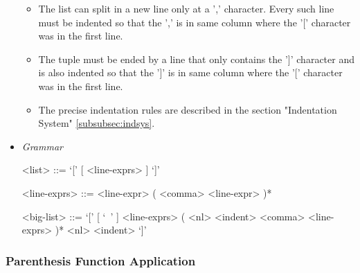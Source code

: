 \documentclass{article}
\begin{document}
\begin{itemize}
\begin{itemize}
  \item
  The list can split in a new line only at a ',' character. Every such line must
  be indented so that the ',' is in same column where the '[' character was in
  the first line.

  \item
  The tuple must be ended by a line that only contains the ']' character and is 
  also indented so that the ']' is in same column where the '[' character was in
  the first line.

  \item
  The precise indentation rules are described in the section
  "Indentation System" \ref{subsubsec:indsys}.
  \end{itemize}

\item \textit{Grammar}
\begin{grammar}
<list> ::= `[' [ <line-exprs> ] `]'

<line-exprs> ::= <line-expr> ( <comma> <line-expr> )*

<big-list> ::= 
`[' [ `\ ' ] <line-exprs> ( <nl> <indent> <comma> <line-exprs> )* <nl> <indent> `]'
\end{grammar}

\end{itemize}

\subsubsection{Parenthesis Function Application}
\label{subsec:parenfuncapp}
\end{document}
